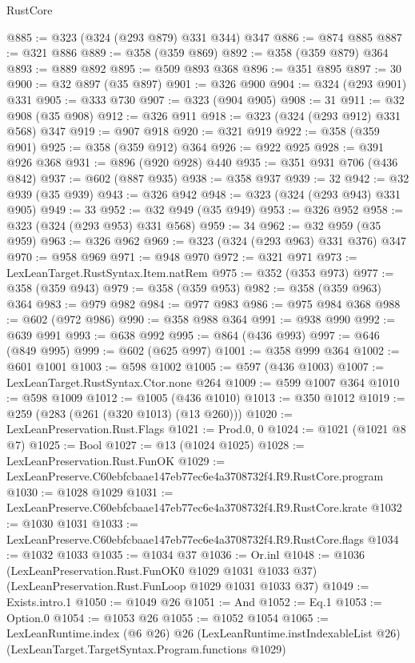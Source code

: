 \begin{lexlean}{RustCore}
\begin{coremodule}
@885 := @323 (@324 (@293 @879) @331 @344) @347
@886 := @874 @885
@887 := @321 @886
@889 := @358 (@359 @869)
@892 := @358 (@359 @879) @364
@893 := @889 @892
@895 := @509 @893 @368
@896 := @351 @895
@897 := 30
@900 := @32 @897 (@35 @897)
@901 := @326 @900
@904 := @324 (@293 @901) @331
@905 := @333 @730
@907 := @323 (@904 @905)
@908 := 31
@911 := @32 @908 (@35 @908)
@912 := @326 @911
@918 := @323 (@324 (@293 @912) @331 @568) @347
@919 := @907 @918
@920 := @321 @919
@922 := @358 (@359 @901)
@925 := @358 (@359 @912) @364
@926 := @922 @925
@928 := @391 @926 @368
@931 := @896 (@920 @928) @440
@935 := @351 @931 @706 (@436 @842)
@937 := @602 (@887 @935)
@938 := @358 @937
@939 := 32
@942 := @32 @939 (@35 @939)
@943 := @326 @942
@948 := @323 (@324 (@293 @943) @331 @905)
@949 := 33
@952 := @32 @949 (@35 @949)
@953 := @326 @952
@958 := @323 (@324 (@293 @953) @331 @568)
@959 := 34
@962 := @32 @959 (@35 @959)
@963 := @326 @962
@969 := @323 (@324 (@293 @963) @331 @376) @347
@970 := @958 @969
@971 := @948 @970
@972 := @321 @971
@973 := LexLeanTarget.RustSyntax.Item.natRem
@975 := @352 (@353 @973)
@977 := @358 (@359 @943)
@979 := @358 (@359 @953)
@982 := @358 (@359 @963) @364
@983 := @979 @982
@984 := @977 @983
@986 := @975 @984 @368
@988 := @602 (@972 @986)
@990 := @358 @988 @364
@991 := @938 @990
@992 := @639 @991
@993 := @638 @992
@995 := @864 (@436 @993)
@997 := @646 (@849 @995)
@999 := @602 (@625 @997)
@1001 := @358 @999 @364
@1002 := @601 @1001
@1003 := @598 @1002
@1005 := @597 (@436 @1003)
@1007 := LexLeanTarget.RustSyntax.Ctor.none @264
@1009 := @599 @1007 @364
@1010 := @598 @1009
@1012 := @1005 (@436 @1010)
@1013 := @350 @1012
@1019 := @259 (@283 (@261 (@320 @1013) (@13 @260)))
@1020 := LexLeanPreservation.Rust.Flags
@1021 := Prod.{0, 0}
@1024 := @1021 (@1021 @8 @7)
@1025 := Bool
@1027 := @13 (@1024 @1025)
@1028 := LexLeanPreservation.Rust.FunOK
@1029 := LexLeanPreserve.C60ebfcbaae147eb77ec6e4a3708732f4.R9.RustCore.program
@1030 := @1028 @1029
@1031 := LexLeanPreserve.C60ebfcbaae147eb77ec6e4a3708732f4.R9.RustCore.krate
@1032 := @1030 @1031
@1033 := LexLeanPreserve.C60ebfcbaae147eb77ec6e4a3708732f4.R9.RustCore.flags
@1034 := @1032 @1033
@1035 := @1034 @37
@1036 := Or.inl
@1048 := @1036
    (LexLeanPreservation.Rust.FunOK0 @1029 @1031 @1033 @37)
    (LexLeanPreservation.Rust.FunLoop @1029 @1031 @1033 @37)
@1049 := Exists.intro.{1}
@1050 := @1049 @26
@1051 := And
@1052 := Eq.{1}
@1053 := Option.{0}
@1054 := @1053 @26
@1055 := @1052 @1054
@1065 := LexLeanRuntime.index
    (@6 @26)
    @26
    (LexLeanRuntime.instIndexableList @26)
    (LexLeanTarget.TargetSyntax.Program.functions @1029)

\end{coremodule}
\end{lexlean}
